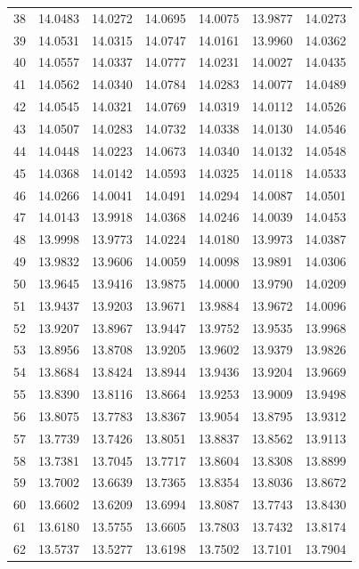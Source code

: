 \begin{longtable}{rrrrrrr}
38 & 14.0483 & 14.0272 & 14.0695 & 14.0075 & 13.9877 & 14.0273 \\
39 & 14.0531 & 14.0315 & 14.0747 & 14.0161 & 13.9960 & 14.0362 \\
40 & 14.0557 & 14.0337 & 14.0777 & 14.0231 & 14.0027 & 14.0435 \\
41 & 14.0562 & 14.0340 & 14.0784 & 14.0283 & 14.0077 & 14.0489 \\
42 & 14.0545 & 14.0321 & 14.0769 & 14.0319 & 14.0112 & 14.0526 \\
43 & 14.0507 & 14.0283 & 14.0732 & 14.0338 & 14.0130 & 14.0546 \\
44 & 14.0448 & 14.0223 & 14.0673 & 14.0340 & 14.0132 & 14.0548 \\
45 & 14.0368 & 14.0142 & 14.0593 & 14.0325 & 14.0118 & 14.0533 \\
46 & 14.0266 & 14.0041 & 14.0491 & 14.0294 & 14.0087 & 14.0501 \\
47 & 14.0143 & 13.9918 & 14.0368 & 14.0246 & 14.0039 & 14.0453 \\
48 & 13.9998 & 13.9773 & 14.0224 & 14.0180 & 13.9973 & 14.0387 \\
49 & 13.9832 & 13.9606 & 14.0059 & 14.0098 & 13.9891 & 14.0306 \\
50 & 13.9645 & 13.9416 & 13.9875 & 14.0000 & 13.9790 & 14.0209 \\
51 & 13.9437 & 13.9203 & 13.9671 & 13.9884 & 13.9672 & 14.0096 \\
52 & 13.9207 & 13.8967 & 13.9447 & 13.9752 & 13.9535 & 13.9968 \\
53 & 13.8956 & 13.8708 & 13.9205 & 13.9602 & 13.9379 & 13.9826 \\
54 & 13.8684 & 13.8424 & 13.8944 & 13.9436 & 13.9204 & 13.9669 \\
55 & 13.8390 & 13.8116 & 13.8664 & 13.9253 & 13.9009 & 13.9498 \\
56 & 13.8075 & 13.7783 & 13.8367 & 13.9054 & 13.8795 & 13.9312 \\
57 & 13.7739 & 13.7426 & 13.8051 & 13.8837 & 13.8562 & 13.9113 \\
58 & 13.7381 & 13.7045 & 13.7717 & 13.8604 & 13.8308 & 13.8899 \\
59 & 13.7002 & 13.6639 & 13.7365 & 13.8354 & 13.8036 & 13.8672 \\
60 & 13.6602 & 13.6209 & 13.6994 & 13.8087 & 13.7743 & 13.8430 \\
61 & 13.6180 & 13.5755 & 13.6605 & 13.7803 & 13.7432 & 13.8174 \\
62 & 13.5737 & 13.5277 & 13.6198 & 13.7502 & 13.7101 & 13.7904 \\

\end{longtable}
